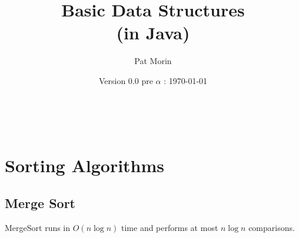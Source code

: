 \documentclass[11pt]{book}
\title{Basic Data Structures\\(in Java)}
\author{Pat Morin}
\date{Version 0.0 pre $\alpha$ : \today}
\begin{document}
\begin{titlepage}
  \maketitle
\end{titlepage}

\ \thispagestyle{empty}\newpage

\setcounter{page}{1}


\tableofcontents













\chapter{Sorting Algorithms}
\section{Merge Sort}

\begin{thm}
  MergeSort runs in $O(n\log n)$ time and performs at most $n\log n$
  comparisons.
\end{thm}
\end{document}
